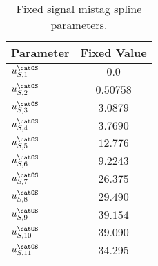 \begin{table}[htb]
\caption{Fixed signal \OS mistag spline parameters.}
\label{tab:app:measurement_of_sin2beta:cpv_measurement:fixed_parameters:eta:sig:os}
\centering
\begin{tabular}{lr@{$\,\pm\,$}l}
  \toprule
  Parameter                & \multicolumn{2}{c}{Fixed Value} \\
  \midrule
  $u_{S,1}^\text{\catOS}$  & \multicolumn{2}{c}{$0.0$}\\
  $u_{S,2}^\text{\catOS}$  & \multicolumn{2}{c}{$0.50758$}\\
  $u_{S,3}^\text{\catOS}$  & \multicolumn{2}{c}{$3.0879$}\\
  $u_{S,4}^\text{\catOS}$  & \multicolumn{2}{c}{$3.7690$}\\
  $u_{S,5}^\text{\catOS}$  & \multicolumn{2}{c}{$12.776$}\\
  $u_{S,6}^\text{\catOS}$  & \multicolumn{2}{c}{$9.2243$}\\
  $u_{S,7}^\text{\catOS}$  & \multicolumn{2}{c}{$26.375$}\\
  $u_{S,8}^\text{\catOS}$  & \multicolumn{2}{c}{$29.490$}\\
  $u_{S,9}^\text{\catOS}$  & \multicolumn{2}{c}{$39.154$}\\
  $u_{S,10}^\text{\catOS}$ & \multicolumn{2}{c}{$39.090$}\\
  $u_{S,11}^\text{\catOS}$ & \multicolumn{2}{c}{$34.295$}\\
  \bottomrule
\end{tabular}
\end{table}
%
